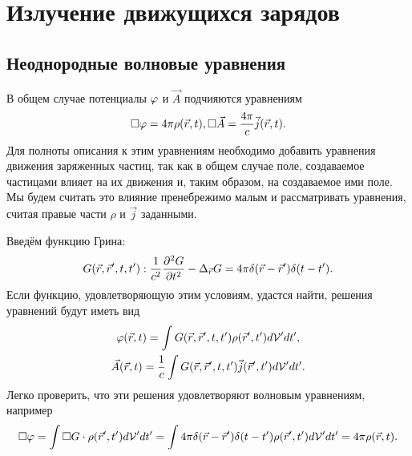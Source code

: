 \newpage
\section{Излучение движущихся зарядов}
\subsection{Неоднородные волновые уравнения}
    В общем случае потенциалы $\varphi$ и $\vec{A}$ подчияются уравнениям
    \begin{gather*}
        \Box \varphi = 4\pi\rho(\vec{r}, t),
        \Box \vec{A} = \frac{4\pi}{c}\vec{j}(\vec{r}, t).
    \end{gather*}
    Для полноты описания к этим уравнениям необходимо добавить уравнения движения заряженных частиц, так как в общем случае поле, создаваемое
    частицами влияет на их движения и, таким образом, на создаваемое ими поле. Мы будем считать это влияние пренебрежимо малым и рассматривать 
    уравнения, считая правые части $\rho$ и $\vec{j}$ заданными.

    Введём функцию Грина:
    \[
        G(\vec{r}, \vec{r}', t, t') : \frac 1{c^2}\frac{\partial^2G}{\partial{t}^2} - \Delta_{\vec{r}}G = 4\pi\delta(\vec{r} - \vec{r}')\delta(t - t').
    \]
    Если функцию, удовлетворяющую этим условиям, удастся найти, решения уравнений будут иметь вид
    \begin{gather*}
        \varphi(\vec{r}, t) = \int G(\vec{r}, \vec{r}', t, t') \rho(\vec{r}', t') d\mathcal{V}'dt',\\
        \vec{A}(\vec{r}, t) = \frac 1c \int G(\vec{r}, \vec{r}', t, t') \vec{j}(\vec{r}', t') d\mathcal{V}'dt'.
    \end{gather*}
    Легко проверить, что эти решения удовлетворяют волновым уравнениям, например
    \[
        \Box\varphi = \int \Box G \cdot\rho(\vec{r}', t')d\mathcal{V}'dt' = 
        \int 4\pi\delta(\vec{r} - \vec{r}')\delta(t - t') \rho(\vec{r}', t')d\mathcal{V}'dt' = 4\pi\rho(\vec{r}, t).
    \]

